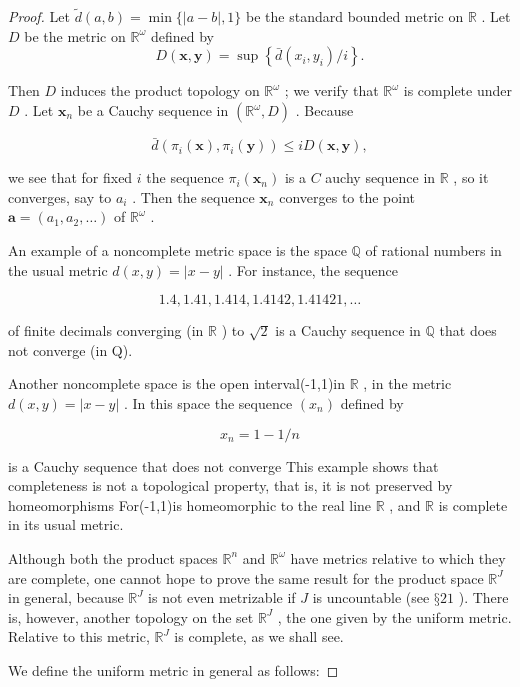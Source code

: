 \begin{proof}Let \(\widetilde{d}\left( {a,b}\right)  = \min \{ \left| {a - b}\right| ,1\}\) be the standard bounded metric on \(\mathbb{R}\) . Let \(D\) be the metric on \({\mathbb{R}}^{\omega }\) defined by
\[
D\left( {\mathbf{x},\mathbf{y}}\right)  = \sup \left\{  {\bar{d}\left( {{x}_{i},{y}_{i}}\right) /i}\right\}  .
\]

Then \(D\) induces the product topology on \({\mathbb{R}}^{\omega }\) ; we verify that \({\mathbb{R}}^{\omega }\) is complete under \(D\) . Let \({\mathbf{x}}_{n}\) be a Cauchy sequence in \(\left( {{\mathbb{R}}^{\omega },D}\right)\) . Because

\[
\bar{d}\left( {{\pi }_{i}\left( \mathbf{x}\right) ,{\pi }_{i}\left( \mathbf{y}\right) }\right)  \leq  {iD}\left( {\mathbf{x},\mathbf{y}}\right) ,
\]

we see that for fixed \(i\) the sequence \({\pi }_{i}\left( {\mathbf{x}}_{n}\right)\) is a \(C\) auchy sequence in \(\mathbb{R}\) , so it converges, say to \({a}_{i}\) . Then the sequence \({\mathbf{x}}_{n}\) converges to the point \(\mathbf{a} = \left( {{a}_{1},{a}_{2},\ldots }\right)\) of \({\mathbb{R}}^{\omega }\) .

\begin{example} An example of a noncomplete metric space is the space \(\mathbb{Q}\) of rational numbers in the usual metric \(d\left( {x,y}\right)  = \left| {x - y}\right|\) . For instance, the sequence

\[
{1.4},{1.41},{1.414},{1.4142},{1.41421},\ldots
\]

of finite decimals converging (in \(\mathbb{R}\) ) to \(\sqrt{2}\) is a Cauchy sequence in \(\mathbb{Q}\) that does not converge (in Q).
\end{example}

\begin{example} Another noncomplete space is the open interval(-1,1)in \(\mathbb{R}\) , in the metric \(d\left( {x,y}\right)  = \left| {x - y}\right|\) . In this space the sequence \(\left( {x}_{n}\right)\) defined by

\[
{x}_{n} = 1 - 1/n
\]

is a Cauchy sequence that does not converge This example shows that completeness is not a topological property, that is, it is not preserved by homeomorphisms For(-1,1)is homeomorphic to the real line \(\mathbb{R}\) , and \(\mathbb{R}\) is complete in its usual metric.
\end{example}

Although both the product spaces \({\mathbb{R}}^{n}\) and \({\mathbb{R}}^{\omega }\) have metrics relative to which they are complete, one cannot hope to prove the same result for the product space \({\mathbb{R}}^{J}\) in general, because \({\mathbb{R}}^{J}\) is not even metrizable if \(J\) is uncountable (see \(§{21}\) ). There is, however, another topology on the set \({\mathbb{R}}^{J}\) , the one given by the uniform metric. Relative to this metric, \({\mathbb{R}}^{J}\) is complete, as we shall see.

We define the uniform metric in general as follows:
\end{proof}
